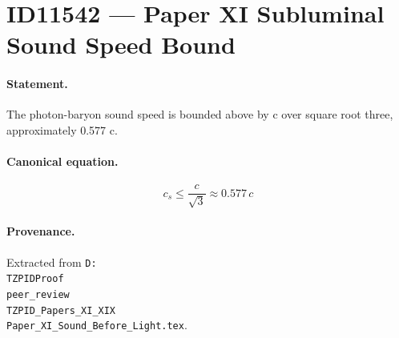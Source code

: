 \section*{ID11542 --- Paper XI Subluminal Sound Speed Bound}

\paragraph{Statement.}
The photon-baryon sound speed is bounded above by c over square root three, approximately 0.577 c.

\paragraph{Canonical equation.}
\[
c_s\leq\frac{c}{\sqrt3}\approx0.577\,c
\]

\paragraph{Provenance.}
Extracted from \texttt{D:\\TZPIDProof\\peer\_review\\TZPID\_Papers\_XI\_XIX\\Paper\_XI\_Sound\_Before\_Light.tex}.
